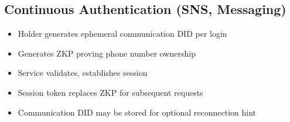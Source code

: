 \subsection{Continuous Authentication (SNS, Messaging)}

\begin{itemize}
  \item Holder generates ephemeral communication DID per login
  \item Generates ZKP proving phone number ownership
  \item Service validates, establishes session
  \item Session token replaces ZKP for subsequent requests
  \item Communication DID may be stored for optional reconnection hint
\end{itemize}

